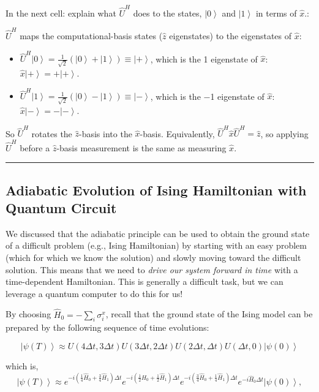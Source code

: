 \documentclass[11pt]{article}
\providecommand{\tightlist}{%
      \setlength{\itemsep}{0pt}\setlength{\parskip}{0pt}}
\providecommand{\ket}[1]{\left|#1\right\rangle}
\begin{document}
In the next cell: explain what \(\hat{U}^H\) does to the states,
\(\ket{0}\) and \(\ket{1}\) in terms of \(\hat{x}\).:

    \(\hat{U}^H\) maps the computational-basis states (\(\hat{z}\)
eigenstates) to the eigenstates of \(\hat{x}\):

\begin{itemize}
\tightlist
\item
  \(\hat{U}^H\ket{0} = \tfrac{1}{\sqrt{2}}(\ket{0}+\ket{1}) \equiv \ket{+}\),
  which is the 1 eigenstate of \(\hat{x}\):
  \(\hat{x}\ket{+} = +\ket{+}\).
\item
  \(\hat{U}^H\ket{1} = \tfrac{1}{\sqrt{2}}(\ket{0}-\ket{1}) \equiv \ket{-}\),
  which is the −1 eigenstate of \(\hat{x}\):
  \(\hat{x}\ket{-} = -\ket{-}\).
\end{itemize}

So \(\hat{U}^H\) rotates the \(\hat{z}\)-basis into the
\(\hat{x}\)-basis. Equivalently,
\(\hat{U}^H \hat{x} \hat{U}^H = \hat{z}\), so applying \(\hat{U}^H\)
before a \(\hat{z}\)-basis measurement is the same as measuring
\(\hat{x}\).

    \begin{center}\rule{0.5\linewidth}{0.5pt}\end{center}

\subsection{Adiabatic Evolution of Ising Hamiltonian with Quantum
Circuit}\label{adiabatic-evolution-of-ising-hamiltonian-with-quantum-circuit}

We discussed that the adiabatic principle can be used to obtain the
ground state of a difficult problem (e.g., Ising Hamiltonian) by
starting with an easy problem (which for which we know the solution) and
slowly moving toward the difficult solution. This means that we need to
\emph{drive our system forward in time} with a time-dependent
Hamiltonian. This is generally a difficult task, but we can leverage a
quantum computer to do this for us!

By choosing \(\hat{H}_0 = - \sum_i \sigma_i^x\), recall that the ground
state of the Ising model can be prepared by the following sequence of
time evolutions:

\[
\ket{\psi(T)} \approx 
U(4\Delta t,3 \Delta t)
U(3\Delta t,2 \Delta t)
U(2\Delta t,\Delta t)
U(\Delta t,0)
\ket{\psi(0)}
\]

which is, \[
\ket{\psi(T)} \approx 
e^{-i\left(\tfrac{1}{4}\hat{H}_0+\tfrac{3}{4}\hat{H}_1\right)\Delta t}
e^{-i\left(\tfrac{1}{2}\hat{H}_0+\tfrac{1}{2}\hat{H}_1\right)\Delta t}
e^{-i\left(\tfrac{3}{4}\hat{H}_0+\tfrac{1}{4}\hat{H}_1\right)\Delta t}
e^{-i\hat{H}_0\Delta t}
\ket{\psi(0)},
\]
\end{document}
